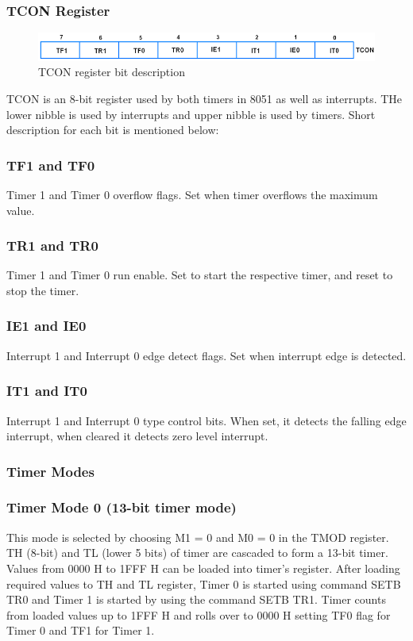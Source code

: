 \documentclass{lab_sheet}
\begin{document}
        \subsubsection{TCON Register}
        \begin{figure}[H]
            \centering
            \includegraphics[scale=0.7]{../Figures/tcon}
            \caption{TCON register bit description}
            \label{fig:tcon}
        \end{figure}
        TCON is an 8-bit register used by both timers in 8051 as well as interrupts. THe lower nibble is used by interrupts and upper nibble is used by timers. Short description for each bit is mentioned below:
        \subsubsection*{TF1 and TF0}
        Timer 1 and Timer 0 overflow flags. Set when timer overflows the maximum value.
        \subsubsection*{TR1 and TR0}
        Timer 1 and Timer 0 run enable. Set to start the respective timer, and reset to stop the timer.
        \subsubsection*{IE1 and IE0}
        Interrupt 1 and Interrupt 0 edge detect flags. Set when interrupt edge is detected.
        \subsubsection*{IT1 and IT0}
        Interrupt 1 and Interrupt 0 type control bits. When set, it detects the falling edge interrupt, when cleared it detects zero level interrupt.
        \subsubsection{Timer Modes}
        \subsubsection*{Timer Mode 0 (13-bit timer mode)}
        This mode is selected by choosing M1 = 0 and M0 = 0
in the TMOD register. TH (8-bit) and TL (lower 5 bits) of
timer are cascaded to form a 13-bit timer. Values
from 0000 H to 1FFF H can be loaded into timer’s register.
After loading required values to TH and TL register,
Timer 0 is started using command SETB TR0 and Timer 1
is started by using the command SETB TR1. Timer counts
from loaded values up to 1FFF H and rolls over to 0000 H
setting TF0 flag for Timer 0 and TF1 for Timer 1.
\end{document}
